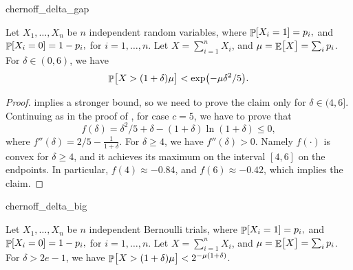 \begin{fragment}{chernoff_delta_gap}
    \begin{lemma}
        Let $X_1, \ldots, X_n$ be $n$ independent random variables,
        where
        \begin{math}
            \Prob{  X_i = 1 } =p_i,
        \end{math}
        and
        \begin{math}
            \Prob{  X_i = 0 } =1- p_i,
        \end{math}
        for $i=1,\ldots, n$.  Let $X = \sum_{i=1}^{n} X_i$, and
        $\mu = \mathop{\mathbb{E}}\!\left[ {\bigl. X} \right] = \sum_i p_i$.  For $\delta \in (0,6)$, we have
        \begin{equation*}
            \Prob{ \bigl. X > (1+\delta)\mu } < \exp \pth{-\mu \delta^2 /
               5}.
        \end{equation*}
    \end{lemma}
\end{fragment}
\begin{proof}
     implies a stronger bound, so we need to
    prove the claim only for $\delta \in (4,6]$. Continuing as in the
    proof of , for case $c=5$, we have to
    prove that
    \begin{equation*}
        f(\delta) = \delta^2/5 + \delta -(1+\delta) \ln(1+\delta)
        \leq 0,
    \end{equation*}
    where
    \begin{math}
        f''(\delta) = 2/5 - \frac{1}{1+\delta}.
    \end{math}
    For $\delta \geq 4$, we have $f''(\delta) > 0$. Namely $f(\cdot)$
    is convex for $\delta \geq 4$, and it achieves its maximum on the
    interval $[4,6]$ on the endpoints. In particular,
    $f(4)\approx -0.84$, and $f(6) \approx -0.42$, which implies the
    claim.
\end{proof}





\begin{fragment}{chernoff_delta_big}
    \begin{lemma}
        Let $X_1, \ldots, X_n$ be $n$ independent Bernoulli trials,
        where
        \begin{math}
            \Prob{ X_i = 1 } =p_i,
        \end{math}
        and
        \begin{math}
            \Prob{ X_i = 0 } =1- p_i,
        \end{math}
        for $i=1,\ldots, n$.  Let $X = \sum_{i=1}^{n} X_i$, and
        $\mu = \mathop{\mathbb{E}}\!\left[ {\bigl. X} \right] = \sum_i p_i$.  For $\delta > 2e-1$, we have
        $\Prob{ \bigl. X > (1+\delta)\mu } < 2^{-\mu (1 + \delta)}$.
    \end{lemma}
\end{fragment}

